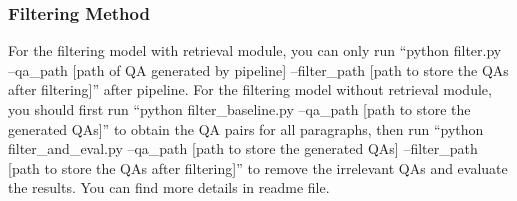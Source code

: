 \subsubsection{Filtering Method}
For the filtering model with retrieval module, you can only run ``python filter.py --qa\_path [path of QA generated by pipeline] --filter\_path [path to store the QAs after filtering]'' after pipeline.
For the filtering model without retrieval module, you should first run ``python filter\_baseline.py --qa\_path [path to store the generated QAs]'' to obtain the QA pairs for all paragraphs, then run ``python filter\_and\_eval.py --qa\_path [path to store the generated QAs] --filter\_path [path to store the QAs after filtering]'' to remove the irrelevant QAs and evaluate the results.
You can find more details in readme file.